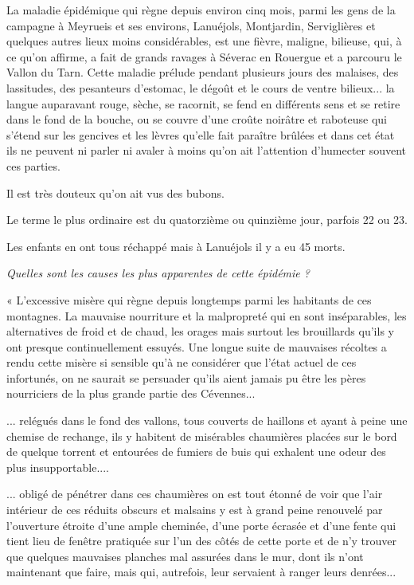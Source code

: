 
{\fontsize{10.25}{12.1}\selectfont
La maladie épidémique qui règne depuis environ cinq mois, parmi les gens de la campagne à Meyrueis et ses environs, Lanuéjols, Montjardin, Serviglières et quelques autres lieux moins considérables, est une fièvre, maligne, bilieuse, qui, à ce qu’on affirme, a fait de grands ravages à Séverac en Rouergue et a parcouru le Vallon du Tarn. Cette maladie prélude pendant plusieurs jours des malaises, des lassitudes, des pesanteurs d’estomac, le dégoût et le cours de ventre bilieux... la langue auparavant rouge, sèche, se racornit, se fend en différents sens et se retire dans le fond de la bouche, ou se couvre d’une croûte noirâtre et raboteuse qui s’étend sur les gencives et les lèvres qu’elle fait paraître brûlées et dans cet état ils ne peuvent ni parler ni avaler à moins qu’on ait l’attention d’humecter souvent ces parties.

Il est très douteux qu’on ait vus des bubons.

Le terme le plus ordinaire est du quatorzième ou quinzième jour, parfois 22 ou 23.



Les enfants en ont tous réchappé mais à Lanuéjols il y a eu 45 morts.

\medskip
\textit{Quelles sont les causes les plus apparentes de cette épidémie ?}

\medskip
« L’excessive misère qui règne depuis longtemps parmi les habitants de ces montagnes. La mauvaise nourriture et la malpropreté qui en sont inséparables, les alternatives de froid et de chaud, les orages mais surtout les brouillards qu’ils y ont presque continuellement essuyés. Une longue suite de mauvaises récoltes a rendu cette misère si sensible qu’à ne considérer que l’état actuel de ces infortunés, on ne saurait se persuader qu’ils aient jamais pu être les pères nourriciers de la plus grande partie des Cévennes...

\medskip
... relégués dans le fond des vallons, tous couverts de haillons et ayant à peine une chemise de rechange, ils y habitent de misérables chaumières placées sur le bord de quelque torrent et entourées de fumiers de buis qui exhalent une odeur des plus insupportable....

\medskip
... obligé de pénétrer dans ces chaumières on est tout étonné de voir que l’air intérieur de ces réduits obscurs et malsains y est à grand peine renouvelé par l’ouverture étroite d’une ample cheminée, d’une porte écrasée et d’une fente qui tient lieu de fenêtre pratiquée sur l’un des côtés de cette porte et de n’y trouver que quelques mauvaises planches mal assurées dans le mur, dont ils n’ont maintenant que faire, mais qui, autrefois, leur servaient à ranger leurs denrées...

}
